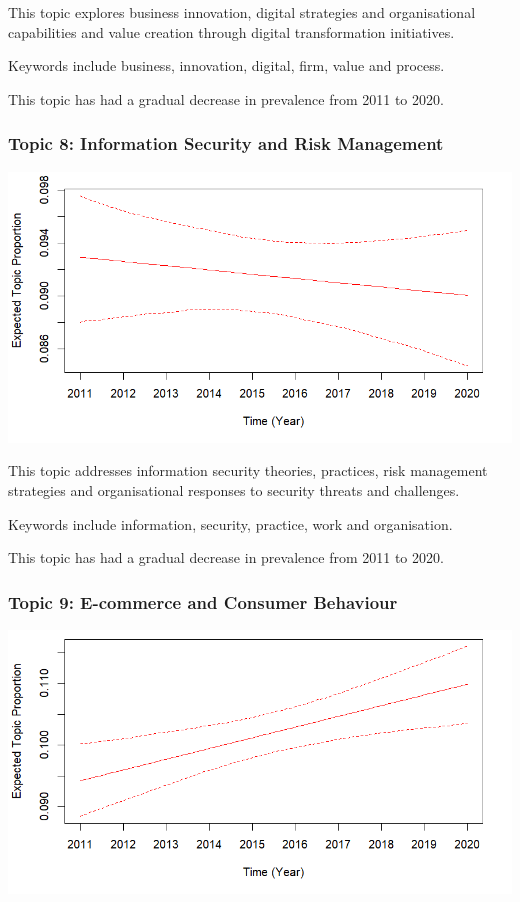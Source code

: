 \documentclass[
  letterpaper,
  DIV=11,
  numbers=noendperiod]{scrartcl}
\begin{document}
This topic explores business innovation, digital strategies and
organisational capabilities and value creation through digital
transformation initiatives.

Keywords include business, innovation, digital, firm, value and process.

This topic has had a gradual decrease in prevalence from 2011 to 2020.

\hypertarget{topic-8-information-security-and-risk-management}{%
\subsubsection{Topic 8: Information Security and Risk
Management}\label{topic-8-information-security-and-risk-management}}

\includegraphics{images/topic8.png}

This topic addresses information security theories, practices, risk
management strategies and organisational responses to security threats
and challenges.

Keywords include information, security, practice, work and organisation.

This topic has had a gradual decrease in prevalence from 2011 to 2020.

\hypertarget{topic-9-e-commerce-and-consumer-behaviour}{%
\subsubsection{Topic 9: E-commerce and Consumer
Behaviour}\label{topic-9-e-commerce-and-consumer-behaviour}}

\includegraphics{images/topic9.png}
\end{document}
